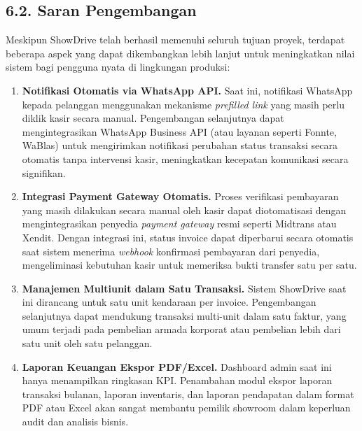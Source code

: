 \documentclass[11pt, a5paper]{article}
\begin{document}
\subsection*{6.2. Saran Pengembangan}

Meskipun ShowDrive telah berhasil memenuhi seluruh tujuan proyek, terdapat
beberapa aspek yang dapat dikembangkan lebih lanjut untuk meningkatkan nilai
sistem bagi pengguna nyata di lingkungan produksi:

\begin{enumerate}[label=\arabic*.]
  \item \textbf{Notifikasi Otomatis via WhatsApp API.}
        Saat ini, notifikasi WhatsApp kepada pelanggan menggunakan mekanisme
        \textit{prefilled link} yang masih perlu diklik kasir secara manual.
        Pengembangan selanjutnya dapat mengintegrasikan WhatsApp Business API
        (atau layanan seperti Fonnte, WaBlas) untuk mengirimkan notifikasi
        perubahan status transaksi secara otomatis tanpa intervensi kasir,
        meningkatkan kecepatan komunikasi secara signifikan.

  \item \textbf{Integrasi Payment Gateway Otomatis.}
        Proses verifikasi pembayaran yang masih dilakukan secara manual oleh
        kasir dapat diotomatisasi dengan mengintegrasikan penyedia
        \textit{payment gateway} resmi seperti Midtrans atau Xendit. Dengan
        integrasi ini, status invoice dapat diperbarui secara otomatis saat
        sistem menerima \textit{webhook} konfirmasi pembayaran dari penyedia,
        mengeliminasi kebutuhan kasir untuk memeriksa bukti transfer satu per
        satu.

  \item \textbf{Manajemen Multiunit dalam Satu Transaksi.}
        Sistem ShowDrive saat ini dirancang untuk satu unit kendaraan per
        invoice. Pengembangan selanjutnya dapat mendukung transaksi multi-unit
        dalam satu faktur, yang umum terjadi pada pembelian armada korporat atau
        pembelian lebih dari satu unit oleh satu pelanggan.

  \item \textbf{Laporan Keuangan Ekspor PDF/Excel.}
        Dashboard admin saat ini hanya menampilkan ringkasan KPI. Penambahan
        modul ekspor laporan transaksi bulanan, laporan inventaris, dan laporan
        pendapatan dalam format PDF atau Excel akan sangat membantu pemilik
        showroom dalam keperluan audit dan analisis bisnis.


\end{enumerate}
\end{document}
